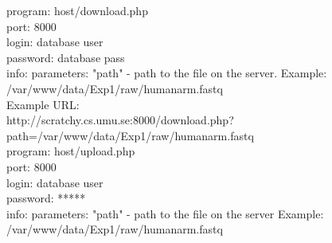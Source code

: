 \makebox[\linewidth]{\rule{\textwidth}{0.4pt}}
program: host/download.php\\
port: 8000\\
login: database user\\
password: database pass\\
info: parameters: "path" - path to the file on the server. Example:\\ /var/www/data/Exp1/raw/humanarm.fastq\\
Example URL:\\ http://scratchy.cs.umu.se:8000/download.php?\\ path=/var/www/data/Exp1/raw/humanarm.fastq\\
\makebox[\linewidth]{\rule{\textwidth}{0.4pt}}
program: host/upload.php\\
port: 8000\\
login: database user\\
password: *****\\
info: parameters: "path" - path to the file on the server Example:\\ /var/www/data/Exp1/raw/humanarm.fastq\\